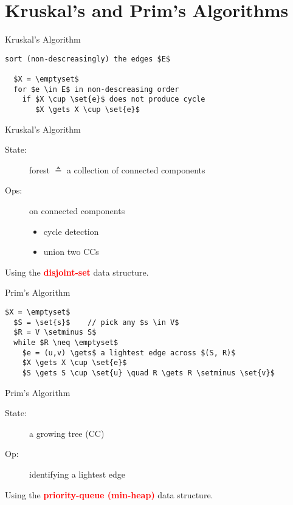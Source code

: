 \section{Kruskal's and Prim's Algorithms}	\label{section:mst-algs}

\begin{frame}[fragile]{Kruskal's Algorithm}
  \begin{lstlisting}[style = code]
  sort (non-descreasingly) the edges $E$

  $X = \emptyset$
  for $e \in E$ in non-descreasing order
    if $X \cup \set{e}$ does not produce cycle
       $X \gets X \cup \set{e}$
  \end{lstlisting}

\end{frame}
\begin{frame}[fragile]{Kruskal's Algorithm}
  \begin{description}
	\item[State:] forest $\triangleq$ a collection of connected components
	\item[Ops:] on connected components
	  \begin{itemize}
		\item cycle detection
		\item union two CCs
	  \end{itemize}
  \end{description}

  \pause

  \begin{center}
	Using the \textcolor{red}{\bf disjoint-set} data structure.
  \end{center}
\end{frame}
\begin{frame}[fragile]{Prim's Algorithm}
  \begin{lstlisting}[style = code]
  $X = \emptyset$
  $S = \set{s}$    // pick any $s \in V$
  $R = V \setminus S$
  while $R \neq \emptyset$
    $e = (u,v) \gets$ a lightest edge across $(S, R)$ 
    $X \gets X \cup \set{e}$
    $S \gets S \cup \set{u} \quad R \gets R \setminus \set{v}$
  \end{lstlisting}

\end{frame}
\begin{frame}[fragile]{Prim's Algorithm}
  \begin{description}
	\item[State:] a growing tree (CC)
	\item[Op:] identifying a lightest edge
  \end{description}

  \pause

  \begin{center}
	Using the \textcolor{red}{\bf priority-queue (min-heap)} data structure.
  \end{center}
\end{frame}
